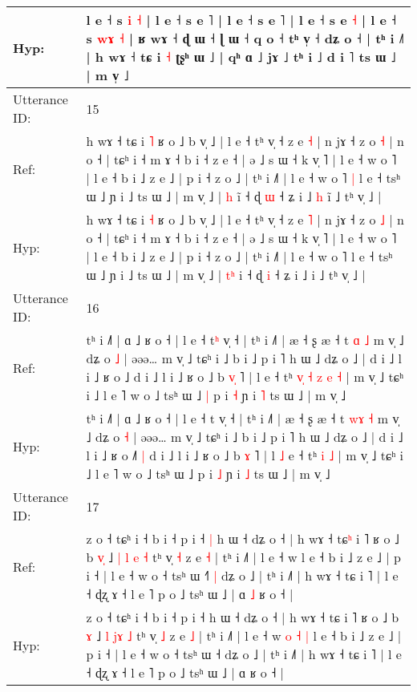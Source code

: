 \documentclass[10pt]{article}
\DeclareRobustCommand{\hl}[1]{{\textcolor{red}{#1}}}
\begin{document}
\begin{longtable}{ll}
 \\
Hyp: & l e ˧ s \hl{i} \hl{˧} | l e ˧ s e ˥ | l e ˧ s e ˥ | l e ˧ s e \hl{˧} | l e ˧ s \hl{w}\hl{ɤ} \hl{˧} | ʁ wɤ ˧\hl{}\hl{} ɖ ɯ ˧ ɭ ɯ ˧ q o ˧ tʰ v̩ ˧ dʑ o ˧ | tʰ i ˩˥ | h wɤ ˧ tɕ i \hl{˧} ʈʂʰ ɯ ˩ | qʰ ɑ ˩ jɤ ˩ tʰ i ˩ d i ˥ ts ɯ ˩ | m v̩ ˩
 \\
\midrule
Utterance ID: & 15 \\
Ref: & h wɤ ˧ tɕ i \hl{˥} ʁ o ˩ b v̩ ˩ | l e ˧ tʰ v̩ ˧ z e \hl{˧} | n jɤ ˧ z o \hl{˧} | n o ˧ | tɕʰ i ˧ m ɤ ˧ b i ˧ z e ˧ | ə ˩ s ɯ ˧ k v̩ ˥ | l e ˧ w o ˥ | l e ˧ b i ˩ z e ˩ | p i ˧ z o ˩ | tʰ i ˩˥ | l e ˧ w o ˥\hl{ }\hl{|} l e ˧ tsʰ ɯ ˩ ɲ i ˩ ts ɯ ˩ | m v̩ ˩ | \hl{}\hl{h} i\hl{̃} ˧ ɖ \hl{ɯ} ˧ ʑ i ˩\hl{ }\hl{h} i\hl{̃} ˩ tʰ v̩ ˩ |
 \\
Hyp: & h wɤ ˧ tɕ i \hl{˧} ʁ o ˩ b v̩ ˩ | l e ˧ tʰ v̩ ˧ z e \hl{˥} | n jɤ ˧ z o \hl{˩} | n o ˧ | tɕʰ i ˧ m ɤ ˧ b i ˧ z e ˧ | ə ˩ s ɯ ˧ k v̩ ˥ | l e ˧ w o ˥ | l e ˧ b i ˩ z e ˩ | p i ˧ z o ˩ | tʰ i ˩˥ | l e ˧ w o ˥\hl{}\hl{} l e ˧ tsʰ ɯ ˩ ɲ i ˩ ts ɯ ˩ | m v̩ ˩ | \hl{t}\hl{ʰ} i\hl{} ˧ ɖ \hl{i} ˧ ʑ i ˩\hl{}\hl{} i\hl{} ˩ tʰ v̩ ˩ |
 \\
\midrule
Utterance ID: & 16 \\
Ref: & tʰ i ˩˥ | ɑ ˩ ʁ o ˧ | l e ˧ t\hl{ʰ} v̩ ˧ | tʰ i ˩˥ | æ ˧ ʂ æ ˧ t \hl{}\hl{ɑ} \hl{˩} m v̩ ˩ dʑ o \hl{˩} | əəə… m v̩ ˩ tɕʰ i ˩ b i ˩ p i ˥ h ɯ ˩ dʑ o ˩ | d i ˩ l i ˩ ʁ o ˩\hl{}\hl{}\hl{} d i ˩ l i ˩ ʁ o ˩ b \hl{v}\hl{̩} ˥ | l\hl{}\hl{} e ˧ tʰ\hl{ }\hl{v}\hl{̩}\hl{ }\hl{˧}\hl{ }\hl{z} \hl{e} \hl{˧} | m v̩ ˩ tɕʰ i ˩ l e ˥ w o ˩ tsʰ ɯ ˩\hl{ }\hl{|} p i \hl{˧} ɲ i \hl{˥} ts ɯ ˩ | m v̩ ˩
 \\
Hyp: & tʰ i ˩˥ | ɑ ˩ ʁ o ˧ | l e ˧ t\hl{} v̩ ˧ | tʰ i ˩˥ | æ ˧ ʂ æ ˧ t \hl{w}\hl{ɤ} \hl{˧} m v̩ ˩ dʑ o \hl{˧} | əəə… m v̩ ˩ tɕʰ i ˩ b i ˩ p i ˥ h ɯ ˩ dʑ o ˩ | d i ˩ l i ˩ ʁ o ˩\hl{˥}\hl{ }\hl{|} d i ˩ l i ˩ ʁ o ˩ b \hl{}\hl{ɤ} ˥ | l\hl{ }\hl{˩} e ˧ tʰ\hl{}\hl{}\hl{}\hl{}\hl{}\hl{}\hl{} \hl{i} \hl{˩} | m v̩ ˩ tɕʰ i ˩ l e ˥ w o ˩ tsʰ ɯ ˩\hl{}\hl{} p i \hl{˩} ɲ i \hl{˩} ts ɯ ˩ | m v̩ ˩
 \\
\midrule
Utterance ID: & 17 \\
Ref: & z o ˧ tɕʰ i ˧ b i ˧ p i ˧\hl{ }\hl{|} h ɯ ˧ dʑ o ˧ | h wɤ ˧ tɕ\hl{ʰ} i ˥ ʁ o ˩ b \hl{v}\hl{̩} ˩ \hl{|} \hl{l}\hl{ }\hl{e} \hl{˧} tʰ v̩ \hl{˧} z e \hl{˧} | tʰ i ˩˥ | l e ˧ w\hl{}\hl{}\hl{}\hl{}\hl{}\hl{} l e ˧ b i ˩ z e ˩ | p i ˧ | l e ˧ w o ˧ tsʰ ɯ ˧\hl{˥}\hl{ }\hl{|} dʑ o ˩ | tʰ i ˩˥ | h wɤ ˧ tɕ i ˥ | l e ˧ ɖʐ ɤ ˧ l e ˥ p o ˩ tsʰ ɯ ˩ | ɑ\hl{ }\hl{˩} ʁ o ˧ |
 \\
Hyp: & z o ˧ tɕʰ i ˧ b i ˧ p i ˧\hl{}\hl{} h ɯ ˧ dʑ o ˧ | h wɤ ˧ tɕ\hl{} i ˥ ʁ o ˩ b \hl{}\hl{ɤ} ˩ \hl{l} \hl{}\hl{j}\hl{ɤ} \hl{˩} tʰ v̩ \hl{˩} z e \hl{˩} | tʰ i ˩˥ | l e ˧ w\hl{ }\hl{o}\hl{ }\hl{˧}\hl{ }\hl{|} l e ˧ b i ˩ z e ˩ | p i ˧ | l e ˧ w o ˧ tsʰ ɯ ˧\hl{}\hl{}\hl{} dʑ o ˩ | tʰ i ˩˥ | h wɤ ˧ tɕ i ˥ | l e ˧ ɖʐ ɤ ˧ l e ˥ p o ˩ tsʰ ɯ ˩ | ɑ\hl{}\hl{} ʁ o ˧ |

\end{longtable}
\end{document}
